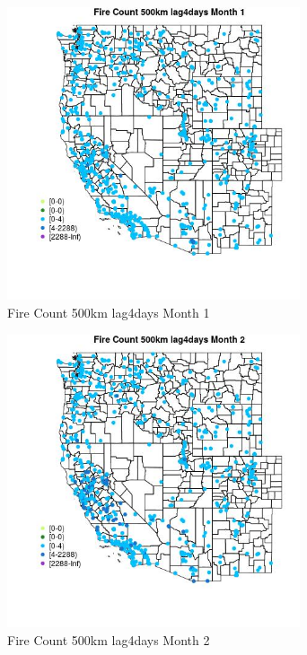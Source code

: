 \begin{figure} 
\centering  
\includegraphics[width=0.77\textwidth]{Code_Outputs/Report_ML_input_PM25_Step4_part_e_de_duplicated_aves_compiled_2019-05-21wNAs_MapObsMo1Fire_Count_500km_lag4days.jpg} 
\caption{\label{fig:Report_ML_input_PM25_Step4_part_e_de_duplicated_aves_compiled_2019-05-21wNAsMapObsMo1Fire_Count_500km_lag4days}Fire Count 500km lag4days Month 1} 
\end{figure} 
 

\begin{figure} 
\centering  
\includegraphics[width=0.77\textwidth]{Code_Outputs/Report_ML_input_PM25_Step4_part_e_de_duplicated_aves_compiled_2019-05-21wNAs_MapObsMo2Fire_Count_500km_lag4days.jpg} 
\caption{\label{fig:Report_ML_input_PM25_Step4_part_e_de_duplicated_aves_compiled_2019-05-21wNAsMapObsMo2Fire_Count_500km_lag4days}Fire Count 500km lag4days Month 2} 
\end{figure} 
 

